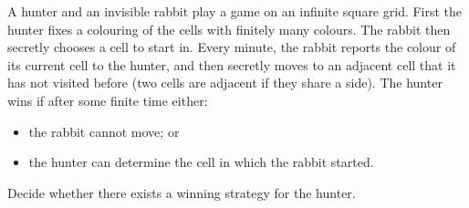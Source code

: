 A hunter and an invisible rabbit play a game on an infinite square grid. First the hunter fixes a colouring of the cells with finitely many colours. The rabbit then secretly chooses a cell to start in. Every minute, the rabbit reports the colour of its current cell to the hunter, and then secretly moves to an adjacent cell that it has not visited before (two cells are adjacent if they share a side). The hunter wins if after some finite time either:
\begin{itemize}
\item the rabbit cannot move; or
\item the hunter can determine the cell in which the rabbit started.
\end{itemize}
Decide whether there exists a winning strategy for the hunter.
